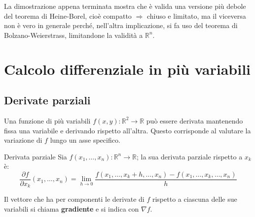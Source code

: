 \documentclass[11pt, a4paper]{scrartcl}
\theoremstyle{definition}
\numberwithin{esempio}{section}
\theoremstyle{definition}
\numberwithin{obs}{section}
\numberwithin{nota}{section}
\numberwithin{equation}{subsection}
\begin{document}
\noindent La dimostrazione appena terminata mostra che \`e valida una versione pi\`u debole del teorema di Heine-Borel, cio\`e compatto $\Rightarrow $ chiuso e limitato, ma il viceversa non \`e vero in generale perch\'e, nell'altra implicazione, si fa uso del teorema di Bolzano-Weierstrass, limitandone la validit\`a a $\mathbb{R}^n$.











































\newpage

\section{Calcolo differenziale in pi\`u variabili}
\subsection{Derivate parziali}

Una funzione di pi\`u variabili $f(x,y):\mathbb{R}^2 \to \mathbb{R}$ pu\`o essere derivata mantenendo fissa una variabile e derivando rispetto all'altra. Questo corrisponde al valutare la variazione di $f$ lungo un asse specifico.
\begin{definizione}
	{Derivata parziale}{}
	Sia $f(x_1,\ldots,x_n) :\mathbb{R}^n \to \mathbb{R}$; la sua derivata parziale rispetto a $x_k$ \`e:
	\begin{equation}
		\frac{\partial f}{\partial x_k}(x_1,\ldots,x_n) = \lim_{h \to 0} \frac{f(x_1,\ldots,x_k + h, \ldots, x_n)-f(x_1,\ldots,x_k,\ldots,x_n)}{h}
	\end{equation}
\end{definizione}
\noindent Il vettore che ha per componenti le derivate di $f$ rispetto a ciascuna delle sue variabili si chiama \textbf{gradiente} e si indica con $\nabla f$.
\end{document}
